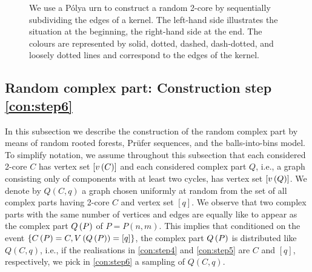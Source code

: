 \begin{figure}[t]
	\caption{We use a P\'olya urn to construct a random 2-core by sequentially subdividing the edges of a kernel. The left-hand side illustrates the situation at the beginning, the right-hand side at the end. The colours are represented by solid, dotted, dashed, dash-dotted, and loosely dotted lines and correspond to the edges of the kernel.}
\label{fig:polya}
\end{figure}


\subsection[Random complex part]{Random complex part: Construction step \ref{con:step6}}\label{sub:random_complex_part}
In this subsection we describe the construction of the random complex part by means of random rooted forests, Prüfer sequences, and the balls-into-bins model. To simplify notation, we assume throughout this subsection that each considered 2-core $C$ has vertex set $\left[v\left({C}\right)\right]$ and each considered complex part $Q$, i.e., a graph consisting only of components with at least two cycles, has vertex set $\left[v\left({Q}\right)\right]$. We denote by $Q(C,q)$ a graph chosen uniformly at random from the set of all complex parts having 2-core $C$ and vertex set $[q]$. We observe that two complex parts with the same number of vertices and edges are equally like to appear as the complex part $Q\left(P\right)$ of $P=P(n,m)$. This implies that conditioned on the event $\left\{C\left(P\right)=C, V\left(Q\left(P\right)\right)=[q]\right\}$, the complex part $Q\left(P\right)$ is distributed like $Q(C,q)$, i.e., if the realisations in \ref{con:step4} and \ref{con:step5} are $C$ and $[q]$, respectively, we pick in \ref{con:step6} a sampling of $Q(C,q)$.

